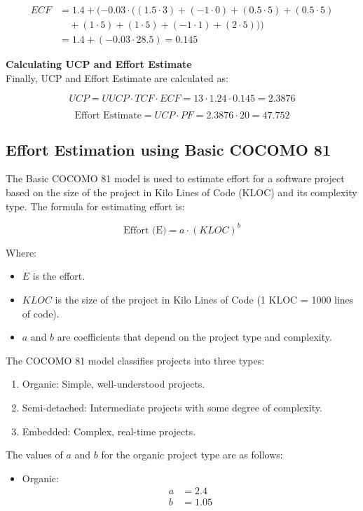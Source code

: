 \documentclass[runningheads]{llncs}
\begin{document}
\[
\begin{aligned}
    ECF &= 1.4 + (-0.03 \cdot ((1.5 \cdot 3) + (-1 \cdot 0) + (0.5 \cdot 5) + (0.5 \cdot 5) \\
    &\quad+ (1 \cdot 5) + (1 \cdot 5) + (-1 \cdot 1) + (2 \cdot 5))) \\
    &= 1.4 + (-0.03 \cdot 28.5) = 0.145
\end{aligned}
\]

\textbf{Calculating UCP and Effort Estimate}\\
Finally, UCP and Effort Estimate are calculated as:

\[
UCP = UUCP \cdot TCF \cdot ECF = 13 \cdot 1.24 \cdot 0.145 = 2.3876
\]

\[
\text{Effort Estimate} = UCP \cdot PF = 2.3876 \cdot 20 = 47.752
\]

\subsection{Effort Estimation using Basic COCOMO 81}

The Basic COCOMO 81 model is used to estimate effort for a software project based on the size of the project in Kilo Lines of Code (KLOC) and its complexity type. The formula for estimating effort is:

\[
\text{Effort (E)} = a \cdot (KLOC)^b
\]

Where:
\begin{itemize}
    \item \(E\) is the effort.
    \item \(KLOC\) is the size of the project in Kilo Lines of Code (1 KLOC = 1000 lines of code).
    \item \(a\) and \(b\) are coefficients that depend on the project type and complexity.
\end{itemize}

The COCOMO 81 model classifies projects into three types:
\begin{enumerate}
    \item Organic: Simple, well-understood projects.
    \item Semi-detached: Intermediate projects with some degree of complexity.
    \item Embedded: Complex, real-time projects.
\end{enumerate}

The values of \(a\) and \(b\) for the organic project type are as follows:

\begin{itemize}
    \item Organic:
    \begin{align*}
        a &= 2.4 \\
        b &= 1.05
    \end{align*}
\end{itemize}
\end{document}
